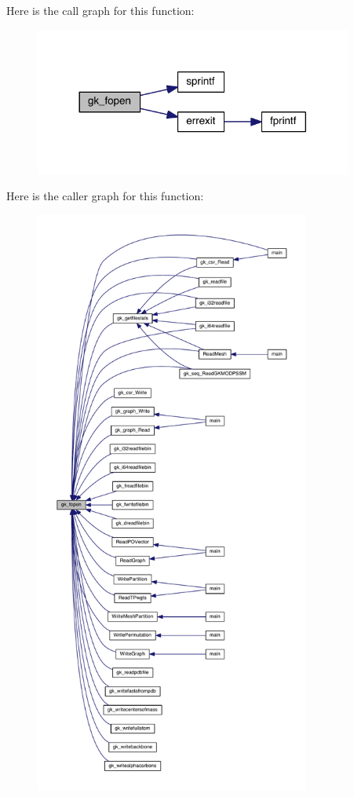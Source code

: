 Here is the call graph for this function\+:\nopagebreak
\begin{figure}[H]
\begin{center}
\leavevmode
\includegraphics[width=296pt]{a00077_ab2b996e10c5bccb30204d81804adfd24_cgraph}
\end{center}
\end{figure}
Here is the caller graph for this function\+:\nopagebreak
\begin{figure}[H]
\begin{center}
\leavevmode
\includegraphics[height=550pt]{a00077_ab2b996e10c5bccb30204d81804adfd24_icgraph}
\end{center}
\end{figure}
\mbox{\label{a00077_a825d4634e2e656bc3dc9f3af0c9b1d5d}} 

